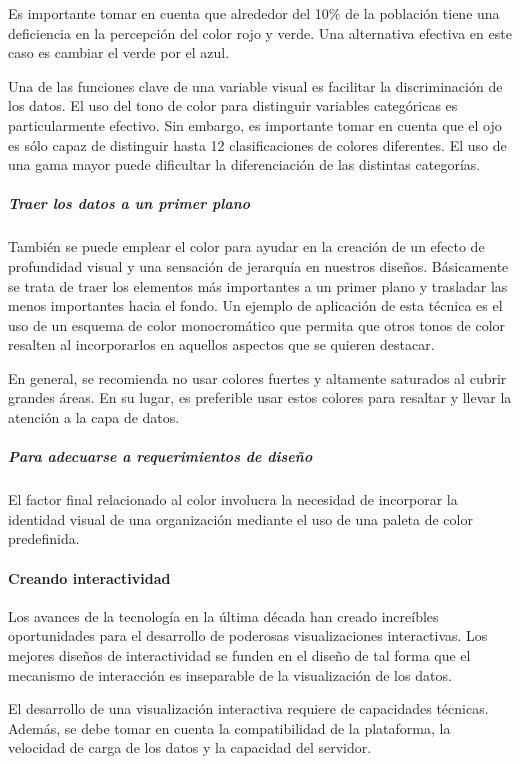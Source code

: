 Es importante tomar en cuenta que alrededor del 10\% de la población tiene una deficiencia en la percepción del color rojo y verde. Una alternativa efectiva en este caso es cambiar el verde por el azul.

Una de las funciones clave de una variable visual es facilitar la discriminación de los datos. El uso del tono de color para distinguir variables categóricas es particularmente efectivo. Sin embargo, es importante tomar en cuenta que el ojo es sólo capaz de distinguir hasta 12 clasificaciones de colores diferentes. El uso de una gama mayor puede dificultar la diferenciación de las distintas categorías.

\subparagraph{Traer los datos a un primer plano}

También se puede emplear el color para ayudar en la creación de un efecto de profundidad visual y una sensación de jerarquía en nuestros diseños. Básicamente se trata de traer los elementos más importantes a un primer plano y trasladar las menos importantes hacia el fondo. Un ejemplo de aplicación de esta técnica es el uso de un esquema de color monocromático que permita que otros tonos de color resalten al incorporarlos en aquellos aspectos que se quieren destacar.

En general, se recomienda no usar colores fuertes y altamente saturados al cubrir grandes áreas. En su lugar, es preferible usar estos colores para resaltar y llevar la atención a la capa de datos.

\subparagraph{Para adecuarse a requerimientos de diseño}

El factor final relacionado al color involucra la necesidad de incorporar la identidad visual de una organización mediante el uso de una paleta de color predefinida.

\paragraph{Creando interactividad}

Los avances de la tecnología en la última década han creado increíbles oportunidades para el desarrollo de poderosas visualizaciones interactivas. Los mejores diseños de interactividad se funden en el diseño de tal forma que el mecanismo de interacción es inseparable de la visualización de los datos.

El desarrollo de una visualización interactiva requiere de capacidades técnicas. Además, se debe tomar en cuenta la compatibilidad de la plataforma, la velocidad de carga de los datos y la capacidad del servidor.

